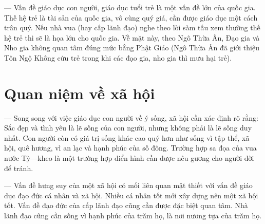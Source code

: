 — Vấn đề giáo dục con người, giáo dục tuổi trẻ là một vấn đề lớn của quốc gia. Thế hệ trẻ là tài sản của quốc gia, vô cùng quý giá, cần được giáo dục một cách trân quý. Nếu nhà vua (hay cấp lãnh đạo) nghe theo lời sàm tấu xem thường thế hệ trẻ thì sẽ là họa lớn cho quốc gia. Về mặt này, theo Ngô Thừa Ân, Đạo gia và Nho gia không quan tâm đúng mức bằng Phật Giáo (Ngô Thừa Ân đã giới thiệu Tôn Ngộ Không cứu trẻ trong khi các đạo gia, nho gia thì mưu hại trẻ).

\section{Quan niệm về xã hội} %
\label{sec:78_79_xa_hoi}

— Song song với việc giáo dục con người về ý sống, xã hội cần xác định rõ rằng: Sắc đẹp và tình yêu là lẽ sống của con người, nhưng không phải là lẽ sống duy nhất. Con người còn có giá trị sống khác cao quý hơn như sống vì tập thể, xã hội, quê hương, vì an lạc và hạnh phúc của số đông. Trường hợp sa đọa của vua nước Tỳ—kheo là một trường hợp điển hình cần được nêu gương cho người đời để tránh.

— Vấn đề hưng suy của một xã hội có mối liên quan mật thiết với vấn đề giáo dục đạo đức cá nhân và xã hội. Nhiều cá nhân tốt mới xây dựng nên một xã hội tốt. Vấn đề đạo đức của cấp lãnh đạo cũng cần được đặc biệt quan tâm. Nhà lãnh đạo cũng cần sống vì hạnh phúc của trăm họ, là nơi nương tựa của trăm họ.
